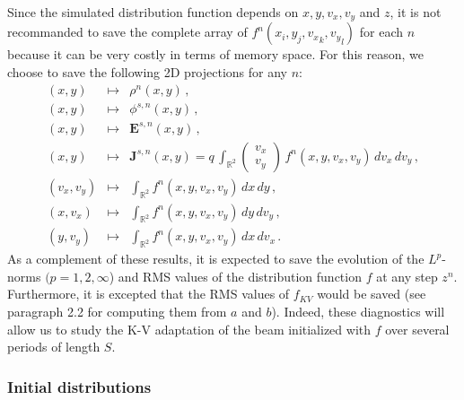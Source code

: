 \documentclass[10pt]{article}
\newcommand{\R}{{\mathbb R}}
\begin{document}
\indent Since the simulated distribution function depends on $x,y,v_{x},v_{y}$ and $z$, it is not recommanded to save the complete array of $f^{n}(x_{i},y_{j},{v_{x}}_{k},{v_{y}}_{l})$ for each $n$ because it can be very costly in terms of memory space. For this reason, we choose to save the following 2D projections for any $n$:
\begin{equation}
\begin{array}{rcl}
(x,y) & \longmapsto & \rho^{n}(x,y) \, , \\
(x,y) & \longmapsto & \phi^{s,n}(x,y) \, , \\
(x,y) & \longmapsto & \mathbf{E}^{s,n}(x,y) \, , \\
(x,y) & \longmapsto & \mathbf{J}^{s,n}(x,y) = \displaystyle q \, \int_{\R^{2}} \left(
\begin{array}{c}
v_{x} \\ v_{y}
\end{array}
\right) \, f^{n}(x,y,v_{x},v_{y}) \, dv_{x} \, dv_{y} \, , \\
(v_{x},v_{y}) & \longmapsto & \displaystyle \int_{\R^{2}} f^{n}(x,y,v_{x},v_{y}) \, dx\, dy \, , \\
(x,v_{x}) & \longmapsto & \displaystyle \int_{\R^{2}} f^{n}(x,y,v_{x},v_{y}) \, dy\, dv_{y} \, , \\
(y,v_{y}) & \longmapsto & \displaystyle \int_{\R^{2}} f^{n}(x,y,v_{x},v_{y}) \, dx\, dv_{x} \, .
\end{array}
\end{equation}
As a complement of these results, it is expected to save the evolution of the $L^{p}$-norms $(p = 1,2,\infty$) and RMS values of the distribution function $f$ at any step $z^{n}$. Furthermore, it is excepted that the RMS values of $f_{KV}$ would be saved (see paragraph 2.2 for computing them from $a$ and $b$). Indeed, these diagnostics will allow us to study the K-V adaptation of the beam initialized with $f$ over several periods of length $S$.


\subsubsection{Initial distributions}
\end{document}
